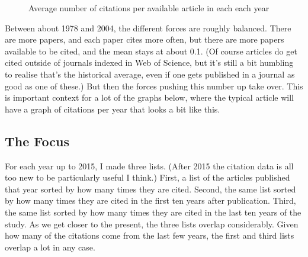 \documentclass[
  10pt,
  letterpaper,
  DIV=11,
  numbers=noendperiod,
  twoside]{scrartcl}
\begin{document}
\begin{figure}


\caption{\label{fig-average-of-citations-by-year}Average number of
citations per available article in each each year}

\end{figure}%

Between about 1978 and 2004, the different forces are roughly balanced.
There are more papers, and each paper cites more often, but there are
more papers available to be cited, and the mean stays at about 0.1. (Of
course articles do get cited outside of journals indexed in Web of
Science, but it's still a bit humbling to realise that's the historical
average, even if one gets published in a journal as good as one of
these.) But then the forces pushing this number up take over. This is
important context for a lot of the graphs below, where the typical
article will have a graph of citations per year that looks a bit like
this.

\subsection{The Focus}\label{the-focus}

For each year up to 2015, I made three lists. (After 2015 the citation
data is all too new to be particularly useful I think.) First, a list of
the articles published that year sorted by how many times they are
cited. Second, the same list sorted by how many times they are cited in
the first ten years after publication. Third, the same list sorted by
how many times they are cited in the last ten years of the study. As we
get closer to the present, the three lists overlap considerably. Given
how many of the citations come from the last few years, the first and
third lists overlap a lot in any case.
\end{document}
